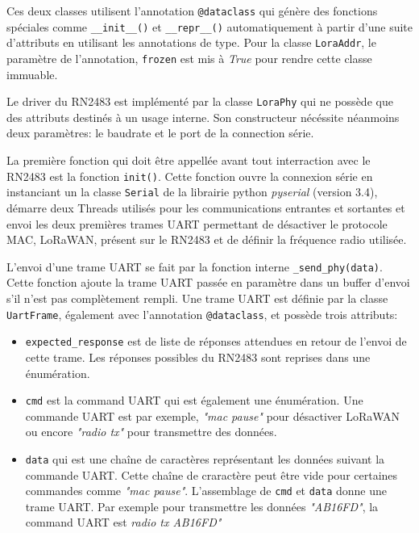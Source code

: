     Ces deux classes utilisent l'annotation \texttt{@dataclass} qui génère des fonctions spéciales 
    comme \texttt{\_\_init\_\_()} et \texttt{\_\_repr\_\_()} automatiquement à partir d'une suite 
    d'attributs en utilisant les annotations de type. Pour la classe \texttt{LoraAddr}, le 
    paramètre de l'annotation, \texttt{frozen} est mis à \textit{True} pour rendre cette classe 
    immuable.

    Le driver du RN2483 est implémenté par la classe \texttt{LoraPhy} qui ne possède que des 
    attributs destinés à un usage interne. Son constructeur nécéssite néanmoins deux paramètres: le 
    baudrate et le port de la connection série.

    La première fonction qui doit être appellée avant tout interraction avec le RN2483 est la 
    fonction \texttt{init()}. Cette fonction ouvre la connexion série en instanciant un la classe 
    \texttt{Serial} de la librairie python \textit{pyserial} (version 3.4), démarre deux Threads 
    utilisés pour les communications entrantes et sortantes et envoi les deux premières trames UART 
    permettant de désactiver le protocole MAC, LoRaWAN, présent sur le RN2483 et de définir la 
    fréquence radio utilisée.

    L'envoi d'une trame UART se fait par la fonction interne \texttt{\_send\_phy(data)}. Cette fonction ajoute la trame UART passée en paramètre dans un buffer d'envoi s'il n'est pas complètement rempli. 
    Une trame UART est définie par la classe \texttt{UartFrame}, également avec l'annotation \texttt{@dataclass}, et possède trois attributs:
    \begin{itemize}
        \item \texttt{expected\_response} est de liste de réponses attendues en retour de l'envoi de cette trame. Les réponses possibles du RN2483 sont reprises dans une énumération. 
        \item \texttt{cmd} est la command UART qui est également une énumération. Une commande UART est par exemple, \textit{"mac pause"} pour désactiver LoRaWAN ou encore \textit{"radio tx"} pour transmettre des données.
        \item \texttt{data} qui est une chaîne de caractères représentant les données suivant la commande UART. Cette chaîne de craractère peut être vide pour certaines commandes comme \textit{"mac pause"}.
        L'assemblage de \texttt{cmd} et \texttt{data} donne une trame UART. Par exemple pour transmettre les données \textit{"AB16FD"}, la command UART est \textit{radio tx AB16FD"}
    \end{itemize}
    \vspace{0.5cm}

